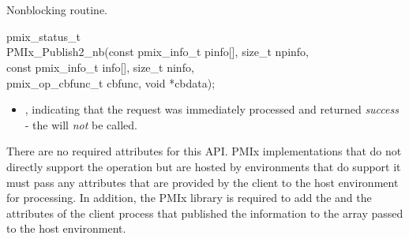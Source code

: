 \section{}


\summary

Nonblocking  routine.

\format

\cspecificstart
\begin{codepar}
pmix_status_t \\
PMIx_Publish2_nb(const pmix_info_t pinfo[], size_t npinfo, \\
\hspace*{12\sigspace}const pmix_info_t info[], size_t ninfo, \\
\hspace*{16\sigspace}pmix_op_cbfunc_t cbfunc, void *cbdata);
\end{codepar}
\cspecificend

\begin{arglist}
\end{arglist}

\returnsimplenb

\returnstart
\begin{itemize}
    \item {}, indicating that the request was immediately processed and returned \textit{success} - the  will \textit{not} be called.
\end{itemize}
\returnend

\reqattrstart
There are no required attributes for this \ac{API}. \ac{PMIx} implementations that do not directly support the operation but are hosted by environments that do support it must pass any attributes that are provided by the client to the host environment for processing. In addition, the \ac{PMIx} library is required to add the  and the  attributes of the client process that published the information to the  array passed to the host environment.
\reqattrend

